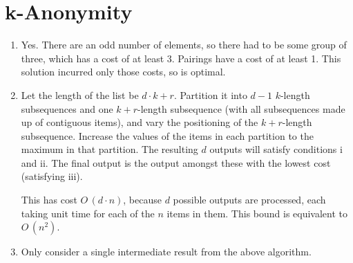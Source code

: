 \documentclass[11pt]{article}
\begin{document}
\section{k-Anonymity}
\begin{enumerate}
\item Yes. There are an odd number of elements, so there had to be some group of three, which has a cost of at least 3. Pairings have a cost of at least 1. This solution incurred only those costs, so is optimal.
\item Let the length of the list be \(d\cdot k+r\). Partition it into \(d-1\) \(k\)-length subsequences and one \(k+r\)-length subsequence (with all subsequences made up of contiguous items), and vary the positioning of the \(k+r\)-length subsequence. Increase the values of the items in each partition to the maximum in that partition. The resulting \(d\) outputs will satisfy conditions i and ii. The final output is the output amongst these with the lowest cost (satisfying iii).

This has cost \(O\,(d\cdot n)\), because \(d\) possible outputs are processed, each taking unit time for each of the \(n\) items in them. This bound is equivalent to \(O\,(n^2)\).
\item Only consider a single intermediate result from the above algorithm.
\end{enumerate}
\end{document}
